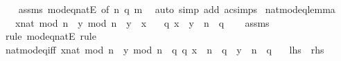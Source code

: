 \begin{isabellebody}
%
\isadelimproof
\ \ %
\endisadelimproof
%
\isatagproof
{}\isamarkupfalse%
\ assms\ mod{\isacharunderscore}{\kern0pt}eq{\isacharunderscore}{\kern0pt}nat{}E\ {\isacharbrackleft}{\kern0pt}of\ n\ q\ m{\isacharbrackright}{\kern0pt}\ \isamarkupfalse%
\ {\isacharparenleft}{\kern0pt}auto\ simp\ add{\isacharcolon}{\kern0pt}\ ac{\isacharunderscore}{\kern0pt}simps{\isacharparenright}{\kern0pt}%
\endisatagproof
{\isafoldproof}%
%
\isadelimproof
\isanewline
%
\endisadelimproof
\isanewline
{}\isamarkupfalse%
\ nat{\isacharunderscore}{\kern0pt}mod{\isacharunderscore}{\kern0pt}eq{\isacharunderscore}{\kern0pt}lemma{\isacharcolon}{\kern0pt}\isanewline
\ \ \ {\isachardoublequoteopen}{\isacharparenleft}{\kern0pt}x{\isacharcolon}{\kern0pt}{\isacharcolon}{\kern0pt}nat{\isacharparenright}{\kern0pt}\ mod\ n\ {\isacharequal}{\kern0pt}\ y\ mod\ n{\isachardoublequoteclose}\ \ {\isachardoublequoteopen}y\ {\isasymle}\ x{\isachardoublequoteclose}\isanewline
\ \ \ {\isachardoublequoteopen}{\isasymexists}q{\isachardot}{\kern0pt}\ x\ {\isacharequal}{\kern0pt}\ y\ {\isacharplus}{\kern0pt}\ n\ {\isacharasterisk}{\kern0pt}\ q{\isachardoublequoteclose}\isanewline
%
\isadelimproof
\ \ %
\endisadelimproof
%
\isatagproof
{}\isamarkupfalse%
\ assms\ \isamarkupfalse%
\ {\isacharparenleft}{\kern0pt}rule\ mod{\isacharunderscore}{\kern0pt}eq{\isacharunderscore}{\kern0pt}nat{}E{\isacharparenright}{\kern0pt}\ rule%
\endisatagproof
{\isafoldproof}%
%
\isadelimproof
\isanewline
%
\endisadelimproof
\isanewline
{}\isamarkupfalse%
\ nat{\isacharunderscore}{\kern0pt}mod{\isacharunderscore}{\kern0pt}eq{\isacharunderscore}{\kern0pt}iff{\isacharcolon}{\kern0pt}\ {\isachardoublequoteopen}{\isacharparenleft}{\kern0pt}x{\isacharcolon}{\kern0pt}{\isacharcolon}{\kern0pt}nat{\isacharparenright}{\kern0pt}\ mod\ n\ {\isacharequal}{\kern0pt}\ y\ mod\ n\ {\isasymlongleftrightarrow}\ {\isacharparenleft}{\kern0pt}{\isasymexists}q{}\ q{}{\isachardot}{\kern0pt}\ x\ {\isacharplus}{\kern0pt}\ n\ {\isacharasterisk}{\kern0pt}\ q{}\ {\isacharequal}{\kern0pt}\ y\ {\isacharplus}{\kern0pt}\ n\ {\isacharasterisk}{\kern0pt}\ q{}{\isacharparenright}{\kern0pt}{\isachardoublequoteclose}\isanewline
\ \ {\isacharparenleft}{\kern0pt}\ {\isachardoublequoteopen}{\isacharquery}{\kern0pt}lhs\ {\isacharequal}{\kern0pt}\ {\isacharquery}{\kern0pt}rhs{\isachardoublequoteclose}{\isacharparenright}{\kern0pt}\isanewline

\end{isabellebody}
